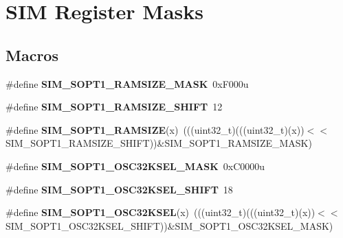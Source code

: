 \hypertarget{group__SIM__Register__Masks}{}\section{S\+IM Register Masks}
\label{group__SIM__Register__Masks}
\subsection*{Macros}
\begin{DoxyCompactItemize}
\item 
\#define {\bfseries S\+I\+M\+\_\+\+S\+O\+P\+T1\+\_\+\+R\+A\+M\+S\+I\+Z\+E\+\_\+\+M\+A\+SK}~0x\+F000u\hypertarget{group__SIM__Register__Masks_ga9fbcfd0b3e4fb08ee733dee975a5df29}{}\label{group__SIM__Register__Masks_ga9fbcfd0b3e4fb08ee733dee975a5df29}

\item 
\#define {\bfseries S\+I\+M\+\_\+\+S\+O\+P\+T1\+\_\+\+R\+A\+M\+S\+I\+Z\+E\+\_\+\+S\+H\+I\+FT}~12\hypertarget{group__SIM__Register__Masks_ga4100f9e8e8ffc766ac1ac6493379b8dc}{}\label{group__SIM__Register__Masks_ga4100f9e8e8ffc766ac1ac6493379b8dc}

\item 
\#define {\bfseries S\+I\+M\+\_\+\+S\+O\+P\+T1\+\_\+\+R\+A\+M\+S\+I\+ZE}(x)~(((uint32\+\_\+t)(((uint32\+\_\+t)(x))$<$$<$S\+I\+M\+\_\+\+S\+O\+P\+T1\+\_\+\+R\+A\+M\+S\+I\+Z\+E\+\_\+\+S\+H\+I\+FT))\&S\+I\+M\+\_\+\+S\+O\+P\+T1\+\_\+\+R\+A\+M\+S\+I\+Z\+E\+\_\+\+M\+A\+SK)\hypertarget{group__SIM__Register__Masks_ga4cd929a0204fbf30ba60cc0899ad039d}{}\label{group__SIM__Register__Masks_ga4cd929a0204fbf30ba60cc0899ad039d}

\item 
\#define {\bfseries S\+I\+M\+\_\+\+S\+O\+P\+T1\+\_\+\+O\+S\+C32\+K\+S\+E\+L\+\_\+\+M\+A\+SK}~0x\+C0000u\hypertarget{group__SIM__Register__Masks_ga5c660cd4a6d8062e6ef4afbc17c27fa4}{}\label{group__SIM__Register__Masks_ga5c660cd4a6d8062e6ef4afbc17c27fa4}

\item 
\#define {\bfseries S\+I\+M\+\_\+\+S\+O\+P\+T1\+\_\+\+O\+S\+C32\+K\+S\+E\+L\+\_\+\+S\+H\+I\+FT}~18\hypertarget{group__SIM__Register__Masks_gac9e930c4ee375a2aee6fa6c97e061226}{}\label{group__SIM__Register__Masks_gac9e930c4ee375a2aee6fa6c97e061226}

\item 
\#define {\bfseries S\+I\+M\+\_\+\+S\+O\+P\+T1\+\_\+\+O\+S\+C32\+K\+S\+EL}(x)~(((uint32\+\_\+t)(((uint32\+\_\+t)(x))$<$$<$S\+I\+M\+\_\+\+S\+O\+P\+T1\+\_\+\+O\+S\+C32\+K\+S\+E\+L\+\_\+\+S\+H\+I\+FT))\&S\+I\+M\+\_\+\+S\+O\+P\+T1\+\_\+\+O\+S\+C32\+K\+S\+E\+L\+\_\+\+M\+A\+SK)\hypertarget{group__SIM__Register__Masks_gaf89520e7506a3dec707983ab729aef08}{}\label{group__SIM__Register__Masks_gaf89520e7506a3dec707983ab729aef08}


\end{DoxyCompactItemize}
